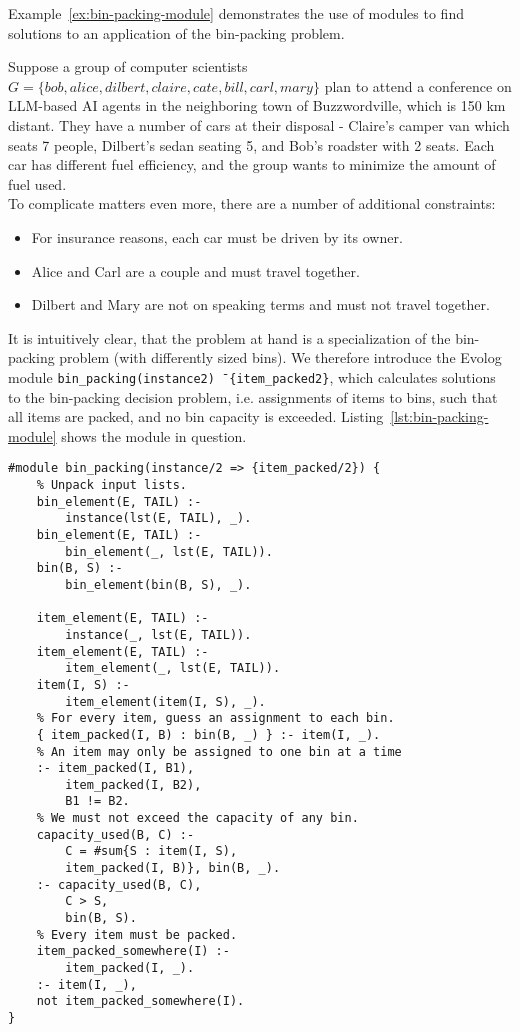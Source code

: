 Example~\ref{ex:bin-packing-module} demonstrates the use of modules to find solutions to an application of the bin-packing problem.

\begin{example}
\label{ex:bin-packing-module}
Suppose a group of computer scientists $G = \{\mathit{bob}, \mathit{alice}, \mathit{dilbert}, \mathit{claire}, \mathit{cate}, \mathit{bill}, \mathit{carl}, \mathit{mary}\}$ plan to attend a conference on LLM-based AI agents in the neighboring town of Buzzwordville, which is 150 km distant. They have a number of cars at their disposal - Claire's camper van which seats 7 people, Dilbert's sedan seating 5, and Bob's roadster with 2 seats. Each car has different fuel efficiency, and the group wants to minimize the amount of fuel used.\\
To complicate matters even more, there are a number of additional constraints:
\begin{itemize}
	\item For insurance reasons, each car must be driven by its owner.
	\item Alice and Carl are a couple and must travel together.
	\item Dilbert and Mary are not on speaking terms and must not travel together.
\end{itemize}
It is intuitively clear, that the problem at hand is a specialization of the bin-packing problem (with differently sized bins). We therefore introduce the Evolog module \texttt{bin\_packing(instance\/2) \=\> \{item\_packed\/2\}}, which calculates solutions to the bin-packing decision problem, i.e. assignments of items to bins, such that all items are packed, and no bin capacity is exceeded. Listing~\ref{lst:bin-packing-module} shows the module in question.
\begin{lstlisting}[style=asp-code, label={lst:bin-packing-module}, caption={Bin-packing module}]
#module bin_packing(instance/2 => {item_packed/2}) {
	% Unpack input lists.
	bin_element(E, TAIL) :- 
		instance(lst(E, TAIL), _).
	bin_element(E, TAIL) :- 
		bin_element(_, lst(E, TAIL)).
	bin(B, S) :- 
		bin_element(bin(B, S), _).
	
	item_element(E, TAIL) :- 
		instance(_, lst(E, TAIL)).
	item_element(E, TAIL) :- 
		item_element(_, lst(E, TAIL)).
	item(I, S) :- 
		item_element(item(I, S), _).
	% For every item, guess an assignment to each bin.
	{ item_packed(I, B) : bin(B, _) } :- item(I, _).
	% An item may only be assigned to one bin at a time
	:- item_packed(I, B1), 
		item_packed(I, B2), 
		B1 != B2.
	% We must not exceed the capacity of any bin.
	capacity_used(B, C) :- 
		C = #sum{S : item(I, S), 
		item_packed(I, B)}, bin(B, _).
	:- capacity_used(B, C), 
		C > S, 
		bin(B, S).
	% Every item must be packed.
	item_packed_somewhere(I) :- 
		item_packed(I, _).
	:- item(I, _), 
	not item_packed_somewhere(I).
}	
\end{lstlisting}


\end{example}
